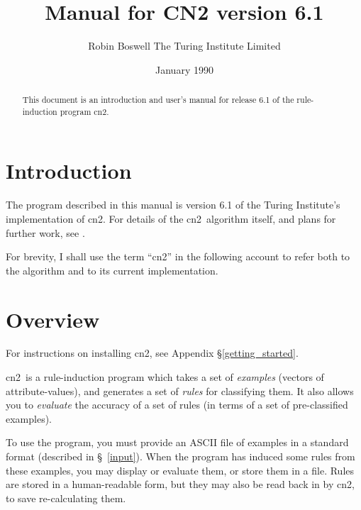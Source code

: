 \def\gap{\hspace{1em}}
\def\CN{{\sc cn2}}
\def\AQ{{\sc aq}}
\def\ID{{\small NewID}}
\def\tab{{\sc tab}}
\def\esc{{\sc esc}}
\def\und{\mbox{\_}}
\def\emacs{{\sc emacs}}
\def\ret{\raisebox{-0.75ex}{$\swarrow$}}
\newcommand{\bt}{~\mbox{${\bullet}$~}}          %
\newcommand{\m}[1]{\mbox{${\tt #1}$}}           %
\author{Robin Boswell \nl The Turing Institute Limited}
\date{January 1990}
\title{Manual for CN2 version 6.1}

\maketitle
\maketable

\begin{abstract}
This document is an introduction and user's manual for release 6.1
of the rule-induction program \CN.
\end{abstract}
\newpage

\tableofcontents
\newpage

\section{Introduction}
The program described in this manual is version 6.1
of the Turing Institute's implementation of \CN.  For details of
the \CN\ algorithm itself, and plans for further work, see
\cite{mlt:7}.  

   For brevity, I shall use the term ``\CN'' in the following account
to refer both to the algorithm and to its current implementation. 

\section{Overview}
For instructions on installing \CN, see Appendix
\S\ref{getting_started}.

\CN\ is a rule-induction program which takes a set of {\it examples}
(vectors of attribute-values), and generates a set of {\it rules} for
classifying them.     It also allows you to {\it evaluate}
the accuracy of a set of rules (in terms of a set of pre-classified
examples).

To use the program, you must provide an 
ASCII file of examples in a standard format (described in 
\S~\ref{input}). When the program has induced some rules from these
examples, you may display or evaluate them, or store them in a file.
Rules are stored in a human-readable form, but they may
also be read back in by \CN, to save re-calculating them.

